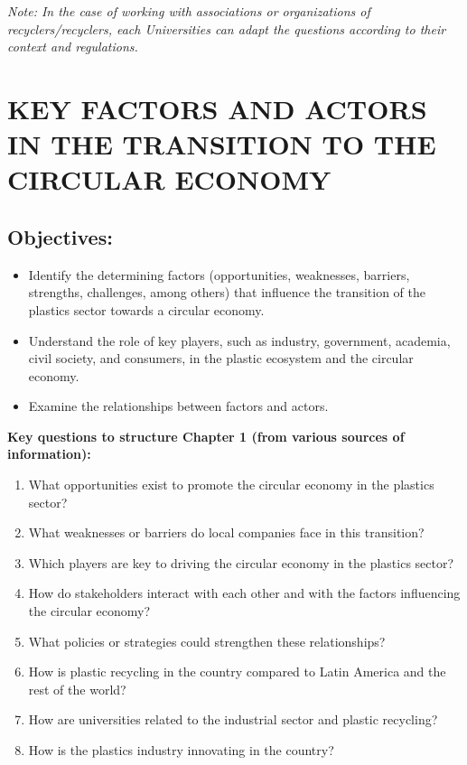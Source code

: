 \documentclass[
  12pt,
  oneside]{book}
\providecommand{\tightlist}{%
  \setlength{\itemsep}{0pt}\setlength{\parskip}{0pt}}
\begin{document}
\emph{Note: In the case of working with associations or organizations of
recyclers/recyclers, each Universities can adapt the questions according
to their context and regulations.}

\section{KEY FACTORS AND ACTORS IN THE TRANSITION TO THE CIRCULAR
ECONOMY}\label{key-factors-and-actors-in-the-transition-to-the-circular-economy}

\subsection{Objectives:}\label{objectives-2}

\begin{itemize}
\tightlist
\item
  Identify the determining factors (opportunities, weaknesses, barriers,
  strengths, challenges, among others) that influence the transition of
  the plastics sector towards a circular economy.
\item
  Understand the role of key players, such as industry, government,
  academia, civil society, and consumers, in the plastic ecosystem and
  the circular economy.
\item
  Examine the relationships between factors and actors.
\end{itemize}

\textbf{Key questions to structure Chapter 1 (from various sources of
information):}

\begin{enumerate}
\def\labelenumi{\arabic{enumi}.}
\tightlist
\item
  What opportunities exist to promote the circular economy in the
  plastics sector?
\item
  What weaknesses or barriers do local companies face in this
  transition?
\item
  Which players are key to driving the circular economy in the plastics
  sector?
\item
  How do stakeholders interact with each other and with the factors
  influencing the circular economy?
\item
  What policies or strategies could strengthen these relationships?
\item
  How is plastic recycling in the country compared to Latin America and
  the rest of the world?
\item
  How are universities related to the industrial sector and plastic
  recycling?
\item
  How is the plastics industry innovating in the country?
\end{enumerate}
\end{document}
